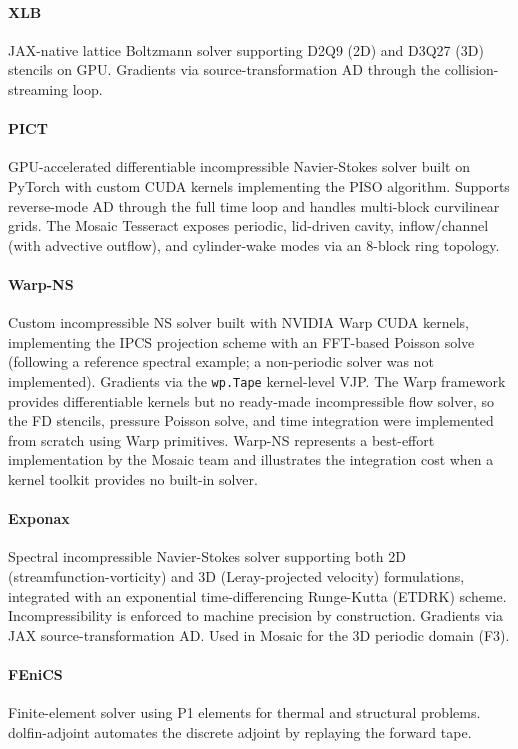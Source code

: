 \documentclass[11pt,a4paper]{article}
\begin{document}
\paragraph{XLB~\cite{ataei2024xlb}}
JAX-native lattice Boltzmann solver supporting D2Q9 (2D) and D3Q27 (3D) stencils on
GPU. Gradients via source-transformation AD through the collision-streaming
loop.

\paragraph{PICT~\cite{franz2025pict}}
GPU-accelerated differentiable incompressible Navier-Stokes solver built on
PyTorch with custom CUDA kernels implementing the PISO algorithm. Supports
reverse-mode AD through the full time loop and handles multi-block
curvilinear grids. The Mosaic Tesseract exposes periodic, lid-driven cavity,
inflow/channel (with advective outflow), and cylinder-wake modes via an
8-block ring topology.

\paragraph{Warp-NS~\cite{macklin2024warp}}
Custom incompressible NS solver built with NVIDIA Warp CUDA kernels,
implementing the IPCS projection scheme with an FFT-based Poisson solve
(following a reference spectral example; a non-periodic solver was not
implemented). Gradients via the \texttt{wp.Tape} kernel-level VJP.
The Warp framework provides differentiable kernels but no ready-made
incompressible flow solver, so the FD stencils, pressure Poisson solve,
and time integration were implemented from scratch using Warp primitives.
Warp-NS represents a best-effort implementation by the Mosaic team and
illustrates the integration cost when a kernel toolkit provides no
built-in solver.

\paragraph{Exponax~\cite{koehler2024apebench}}
Spectral incompressible Navier-Stokes solver supporting both 2D
(streamfunction-vorticity) and 3D (Leray-projected velocity) formulations,
integrated with an exponential time-differencing Runge-Kutta (ETDRK) scheme.
Incompressibility is enforced to machine precision by construction.
Gradients via JAX source-transformation AD.
Used in Mosaic for the 3D periodic domain (F3).

\paragraph{FEniCS~\cite{farrell2013automated}}
Finite-element solver using P1 elements for thermal and structural problems.
dolfin-adjoint automates the discrete adjoint by replaying the forward tape.
\end{document}
